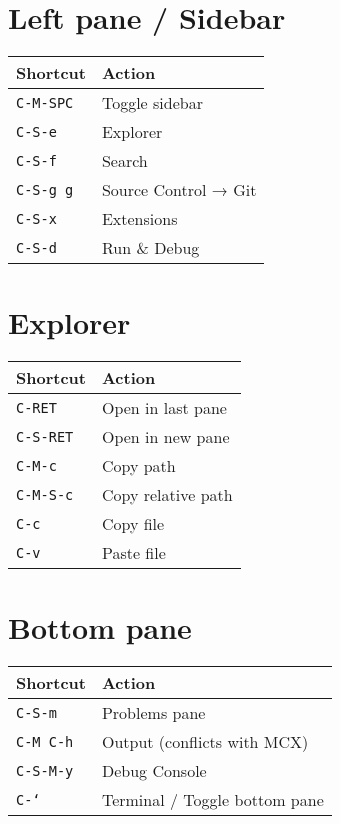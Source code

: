 \documentclass[10pt,landscape]{article}
\newcommand{\key}[1]{\textcolor{keycolor}{\texttt{#1}}}
\begin{document}
\begin{multicols}{2}
\section*{\textcolor{sectioncolor}{Left pane / Sidebar}}

\begin{tabular}{@{}p{3cm}p{6.5cm}@{}}
\toprule
\textbf{Shortcut} & \textbf{Action} \\
\midrule
\key{C-M-SPC} & Toggle sidebar \\
\key{C-S-e} & Explorer \\
\key{C-S-f} & Search \\
\key{C-S-g g} & Source Control → Git \\
\key{C-S-x} & Extensions \\
\key{C-S-d} & Run \& Debug \\
\bottomrule
\end{tabular}

\section*{\textcolor{sectioncolor}{Explorer}}

\begin{tabular}{@{}p{3cm}p{6.5cm}@{}}
\toprule
\textbf{Shortcut} & \textbf{Action} \\
\midrule
\key{C-RET} & Open in last pane \\
\key{C-S-RET} & Open in new pane \\
\key{C-M-c} & Copy path \\
\key{C-M-S-c} & Copy relative path \\
\key{C-c} & Copy file \\
\key{C-v} & Paste file \\
\bottomrule
\end{tabular}

\section*{\textcolor{sectioncolor}{Bottom pane}}

\begin{tabular}{@{}p{3cm}p{6.5cm}@{}}
\toprule
\textbf{Shortcut} & \textbf{Action} \\
\midrule
\key{C-S-m} & Problems pane \\
\key{C-M C-h} & Output (conflicts with MCX) \\
\key{C-S-M-y} & Debug Console \\
\key{C-`} & Terminal / Toggle bottom pane \\
\bottomrule
\end{tabular}


\end{multicols}
\end{document}
